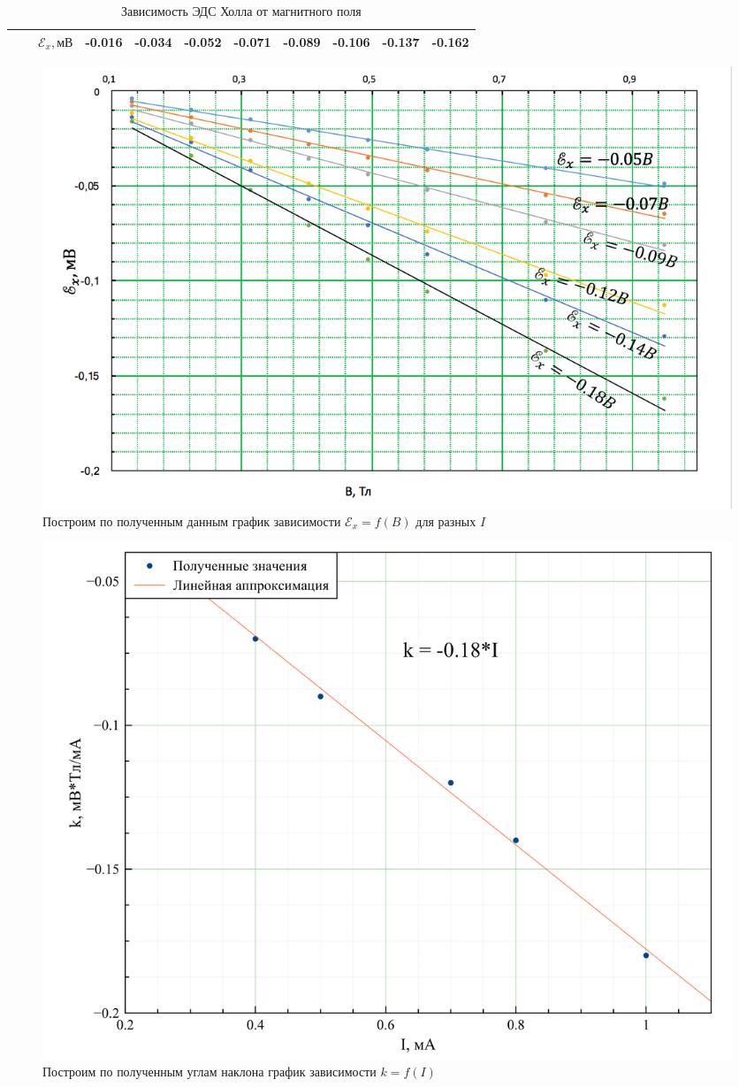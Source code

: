 \documentclass[a4paper, 12pt]{article}
\begin{document}
\begin{table}[H]
{\begin{tabular}{|c|c|c|c|c|c|c|c|c|c|c|}
                                  &                                     & $\mathscr{E}_x, \text{мВ}$                        & -0.016                        & -0.034                        & -0.052                        & -0.071                        & -0.089                        & -0.106                        & -0.137                        & -0.162                        \\ \hline
\end{tabular}
}
\caption{Зависимость ЭДС Холла от магнитного поля}
\end{table}



	\begin {figure}[H]
		\begin{center}
			\includegraphics[width = 0.7 \textwidth]{Graph}
			\caption{Построим по полученным данным график зависимости $\mathscr{E}_x = f(B)$ для разных $I$}
		\end{center}
	\end {figure}


	\begin {figure}[H]
		\begin{center}
		\includegraphics[width = 0.7 \textwidth]{Angle}
			\caption{Построим по полученным углам наклона график зависимости $k = f(I)$}
		\end{center}
	\end {figure}
\end{document}
